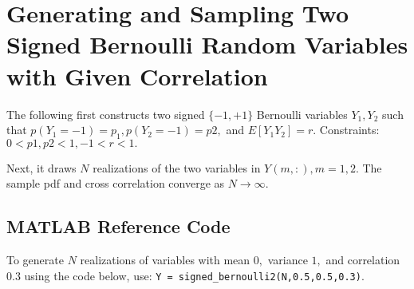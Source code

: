 \section{Generating and Sampling Two Signed Bernoulli Random Variables with Given Correlation}

The following first constructs two signed $\{-1, +1\}$ Bernoulli variables $Y_1, Y_2$ such that $p(Y_1 = -1) = p_1, p(Y_2 = -1) = p2,$ and $E[Y_1Y_2] = r.$ Constraints: $0 < p1, p2 < 1, -1 < r < 1.$ 

Next, it draws $N$ realizations of the two variables in $Y(m,:), m = 1,2.$ The sample pdf and cross correlation converge as $N \to \infty.$

\subsection{MATLAB Reference Code}

To generate $N$ realizations of variables with mean $0,$ variance $1,$ and correlation $0.3$ using the code below, use: \texttt{Y = signed\_bernoulli2(N,0.5,0.5,0.3)}.

